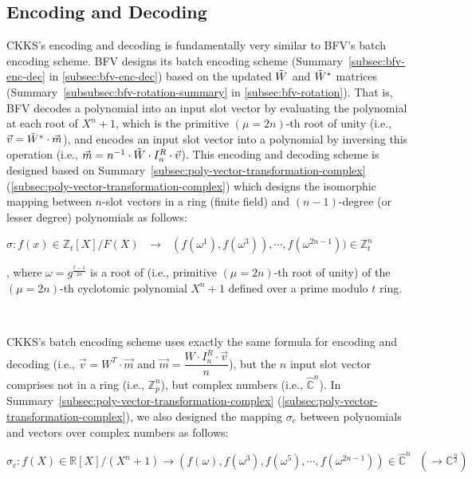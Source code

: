 \clearpage


\subsection{Encoding and Decoding}
\label{subsec:ckks-encoding-decoding}


CKKS's encoding and decoding is fundamentally very similar to BFV's batch encoding scheme. BFV designs its batch encoding scheme (Summary~\ref*{subsec:bfv-enc-dec} in \autoref{subsec:bfv-enc-dec}) based on the updated $\tilde W$ and $\tilde W^*$ matrices (Summary~\ref*{subsubsec:bfv-rotation-summary} in \autoref{subsec:bfv-rotation}). That is, BFV decodes a polynomial into an input slot vector by evaluating the polynomial at each root of $X^n+1$, which is the primitive $(\mu=2n)$-th root of unity (i.e., $\vec{v} = \tilde W^* \cdot \vec{m}$), and encodes an input slot vector into a polynomial by inversing this operation (i.e., $\vec{m} = n^{-1} \cdot \tilde W \cdot I_n^R \cdot \vec{v}$). This encoding and decoding scheme is designed based on Summary~\ref*{subsec:poly-vector-transformation-complex} (\autoref{subsec:poly-vector-transformation-complex}) which designs the isomorphic mapping between $n$-slot vectors in a ring (finite field) and $(n-1)$-degree (or lesser degree) polynomials as follows: 

$\sigma: f(x) \in \mathbb{Z}_t[X] / F(X) \text{ } \longrightarrow \text{ } (f(\omega^1), f(\omega^3)), \cdots, f(\omega^{2n-1})) \in \mathbb{Z}_t^n$

, where $\omega = g^{\frac{t - 1}{2n}}$ is a root of (i.e., primitive $(\mu=2n)$-th root of unity) of the $(\mu=2n)$-th cyclotomic polynomial $X^n + 1$ defined over a prime modulo $t$ ring. 

$ $

CKKS's batch encoding scheme uses exactly the same formula for encoding and decoding (i.e., $\vec{v} = W^T \cdot \vec{m}$ and $\vec{m} = \dfrac{W \cdot I_n^R \cdot \vec{v}}{n}$), but the $n$ input slot vector comprises not in a ring (i.e., $\mathbb{Z}^n_p$), but complex numbers (i.e., $\mathbb{\hat C}^n$). In Summary~\ref*{subsec:poly-vector-transformation-complex} (\autoref{subsec:poly-vector-transformation-complex}), we also designed the mapping $\sigma_c$ between polynomials and vectors over complex numbers as follows:

$\sigma_c: f(X) \in \mathbb{R}[X]/(X^n + 1) \longrightarrow (f(\omega),f(\omega^3),f(\omega^5), \cdots, f(\omega^{2n-1})) \in \mathbb{\hat{C}}^{n} \text{ } (\longrightarrow \mathbb{C}^{\frac{n}{2}})$



